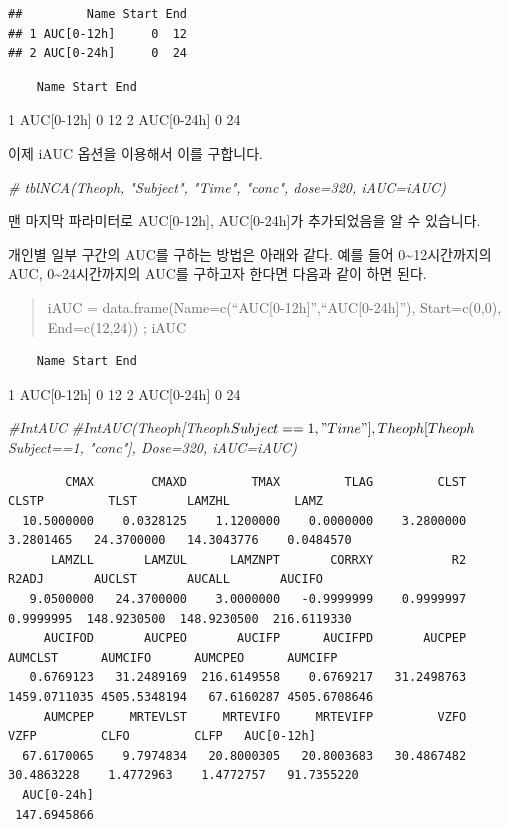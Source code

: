 \documentclass[12pt,]{krantz}
\newenvironment{Shaded}{\begin{snugshade}}{\end{snugshade}}
\newcommand{\CommentTok}[1]{\textcolor[rgb]{0.56,0.35,0.01}{\textit{#1}}}
\begin{document}
\begin{verbatim}
##         Name Start End
## 1 AUC[0-12h]     0  12
## 2 AUC[0-24h]     0  24
\end{verbatim}

\begin{verbatim}
    Name Start End
\end{verbatim}

1 AUC{[}0-12h{]} 0 12
2 AUC{[}0-24h{]} 0 24

이제 iAUC 옵션을 이용해서 이를 구합니다.

\begin{Shaded}
\begin{Highlighting}[]
\CommentTok{# tblNCA(Theoph, "Subject", "Time", "conc", dose=320, iAUC=iAUC)}
\end{Highlighting}
\end{Shaded}

맨 마지막 파라미터로 AUC{[}0-12h{]}, AUC{[}0-24h{]}가 추가되었음을 알 수 있습니다.

개인별 일부 구간의 AUC를 구하는 방법은 아래와 같다.
예를 들어 0\textasciitilde12시간까지의 AUC, 0\textasciitilde24시간까지의 AUC를 구하고자 한다면 다음과 같이 하면 된다.

\begin{quote}
iAUC = data.frame(Name=c(``AUC{[}0-12h{]}'',``AUC{[}0-24h{]}''), Start=c(0,0), End=c(12,24)) ; iAUC
\end{quote}

\begin{verbatim}
    Name Start End
\end{verbatim}

1 AUC{[}0-12h{]} 0 12
2 AUC{[}0-24h{]} 0 24

\begin{Shaded}
\begin{Highlighting}[]
\CommentTok{#IntAUC}
\CommentTok{#IntAUC(Theoph[Theoph$Subject==1,"Time"], Theoph[Theoph$Subject==1, "conc"], Dose=320, iAUC=iAUC)}
\end{Highlighting}
\end{Shaded}

\begin{verbatim}
        CMAX        CMAXD         TMAX         TLAG         CLST        CLSTP         TLST       LAMZHL         LAMZ 
  10.5000000    0.0328125    1.1200000    0.0000000    3.2800000    3.2801465   24.3700000   14.3043776    0.0484570 
      LAMZLL       LAMZUL      LAMZNPT       CORRXY           R2        R2ADJ       AUCLST       AUCALL       AUCIFO 
   9.0500000   24.3700000    3.0000000   -0.9999999    0.9999997    0.9999995  148.9230500  148.9230500  216.6119330 
     AUCIFOD       AUCPEO       AUCIFP      AUCIFPD       AUCPEP      AUMCLST      AUMCIFO      AUMCPEO      AUMCIFP 
   0.6769123   31.2489169  216.6149558    0.6769217   31.2498763 1459.0711035 4505.5348194   67.6160287 4505.6708646 
     AUMCPEP     MRTEVLST     MRTEVIFO     MRTEVIFP         VZFO         VZFP         CLFO         CLFP   AUC[0-12h] 
  67.6170065    9.7974834   20.8000305   20.8003683   30.4867482   30.4863228    1.4772963    1.4772757   91.7355220 
  AUC[0-24h] 
 147.6945866 
\end{verbatim}
\end{document}
